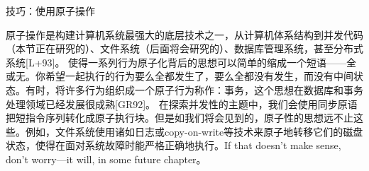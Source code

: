 \begin{tcolorbox}[colframe=grey,colback= grey,arc=0pt,left=6pt,right=6pt,top=6pt,bottom=6pt,boxsep=0pt]
\begin{center}技巧：使用原子操作\end{center}
原子操作是构建计算机系统最强大的底层技术之一，从计算机体系结构到并发代码（本节正在研究的）、文件系统（后面将会研究的）、数据库管理系统，甚至分布式系统[L+93]。
使得一系列行为原子化背后的思想可以简单的缩成一个短语——全或无。你希望一起执行的行为要么全都发生了，要么全都没有发生，而没有中间状态。有时，将许多行为组织成一个原子行为称作：事务，这个思想在数据库和事务处理领域已经发展很成熟[GR92]。
在探索并发性的主题中，我们会使用同步原语把短指令序列转化成原子执行块。但是如我们将会见到的，原子性的思想远不止这些。例如，文件系统使用诸如日志或copy-on-write等技术来原子地转移它们的磁盘状态，使得在面对系统故障时能严格正确地执行。If that doesn’t make sense, don’t worry—it will, in some future chapter。
\end{tcolorbox}


